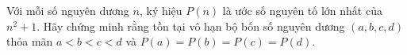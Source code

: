 \ifshowproblem
\begin{problem}\label{example:HUN-2015-TST-KMA-643}
    Với mỗi số nguyên dương \( n \), ký hiệu \( P(n) \) là ước số nguyên tố lớn nhất của \( n^2 + 1 \).
    Hãy chứng minh rằng tồn tại vô hạn bộ bốn số nguyên dương \( (a, b, c, d) \) thỏa mãn \( a < b < c < d \) và \( P(a) = P(b) = P(c) = P(d) \).
\end{problem}
\fi

\fi